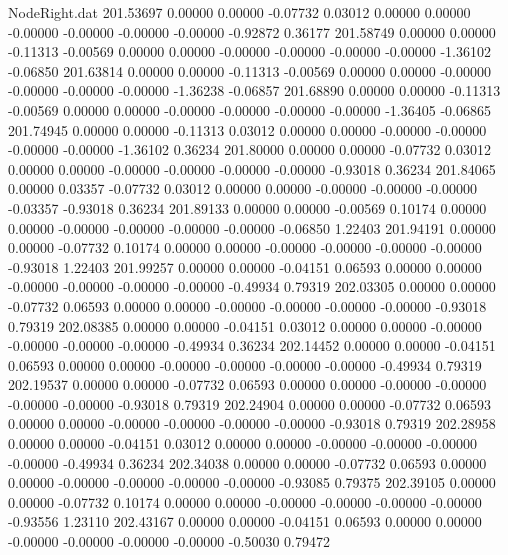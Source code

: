 \begin{filecontents}{NodeRight.dat}
 201.53697    0.00000    0.00000    -0.07732    0.03012    0.00000    0.00000   -0.00000   -0.00000   -0.00000   -0.00000   -0.92872    0.36177
 201.58749    0.00000    0.00000    -0.11313   -0.00569    0.00000    0.00000   -0.00000   -0.00000   -0.00000   -0.00000   -1.36102   -0.06850
 201.63814    0.00000    0.00000    -0.11313   -0.00569    0.00000    0.00000   -0.00000   -0.00000   -0.00000   -0.00000   -1.36238   -0.06857
 201.68890    0.00000    0.00000    -0.11313   -0.00569    0.00000    0.00000   -0.00000   -0.00000   -0.00000   -0.00000   -1.36405   -0.06865
 201.74945    0.00000    0.00000    -0.11313    0.03012    0.00000    0.00000   -0.00000   -0.00000   -0.00000   -0.00000   -1.36102    0.36234
 201.80000    0.00000    0.00000    -0.07732    0.03012    0.00000    0.00000   -0.00000   -0.00000   -0.00000   -0.00000   -0.93018    0.36234
 201.84065    0.00000    0.03357    -0.07732    0.03012    0.00000    0.00000   -0.00000   -0.00000   -0.00000   -0.03357   -0.93018    0.36234
 201.89133    0.00000    0.00000    -0.00569    0.10174    0.00000    0.00000   -0.00000   -0.00000   -0.00000   -0.00000   -0.06850    1.22403
 201.94191    0.00000    0.00000    -0.07732    0.10174    0.00000    0.00000   -0.00000   -0.00000   -0.00000   -0.00000   -0.93018    1.22403
 201.99257    0.00000    0.00000    -0.04151    0.06593    0.00000    0.00000   -0.00000   -0.00000   -0.00000   -0.00000   -0.49934    0.79319
 202.03305    0.00000    0.00000    -0.07732    0.06593    0.00000    0.00000   -0.00000   -0.00000   -0.00000   -0.00000   -0.93018    0.79319
 202.08385    0.00000    0.00000    -0.04151    0.03012    0.00000    0.00000   -0.00000   -0.00000   -0.00000   -0.00000   -0.49934    0.36234
 202.14452    0.00000    0.00000    -0.04151    0.06593    0.00000    0.00000   -0.00000   -0.00000   -0.00000   -0.00000   -0.49934    0.79319
 202.19537    0.00000    0.00000    -0.07732    0.06593    0.00000    0.00000   -0.00000   -0.00000   -0.00000   -0.00000   -0.93018    0.79319
 202.24904    0.00000    0.00000    -0.07732    0.06593    0.00000    0.00000   -0.00000   -0.00000   -0.00000   -0.00000   -0.93018    0.79319
 202.28958    0.00000    0.00000    -0.04151    0.03012    0.00000    0.00000   -0.00000   -0.00000   -0.00000   -0.00000   -0.49934    0.36234
 202.34038    0.00000    0.00000    -0.07732    0.06593    0.00000    0.00000   -0.00000   -0.00000   -0.00000   -0.00000   -0.93085    0.79375
 202.39105    0.00000    0.00000    -0.07732    0.10174    0.00000    0.00000   -0.00000   -0.00000   -0.00000   -0.00000   -0.93556    1.23110
 202.43167    0.00000    0.00000    -0.04151    0.06593    0.00000    0.00000   -0.00000   -0.00000   -0.00000   -0.00000   -0.50030    0.79472

\end{filecontents}

